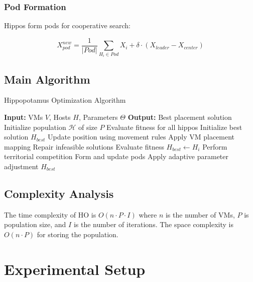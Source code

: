 \documentclass[10pt,conference]{IEEEtran}
\newcommand{\abbrev}{HO}
\begin{document}
\subsubsection{Pod Formation}

Hippos form pods for cooperative search:

\begin{equation}
X_{pod}^{new} = \frac{1}{|Pod|} \sum_{H_i \in Pod} X_i + \delta \cdot (X_{leader} - X_{center})
\end{equation}

\subsection{Main Algorithm}

\begin{algorithm}
\caption{Hippopotamus Optimization Algorithm}
\begin{algorithmic}[1]
\STATE \textbf{Input:} VMs $V$, Hosts $H$, Parameters $\Theta$
\STATE \textbf{Output:} Best placement solution
\STATE Initialize population $\mathcal{H}$ of size $P$
\STATE Evaluate fitness for all hippos
\STATE Initialize best solution $H_{best}$
        \STATE Update position using movement rules
        \STATE Apply VM placement mapping
        \STATE Repair infeasible solutions
        \STATE Evaluate fitness
            \STATE $H_{best} \leftarrow H_i$
        \ENDIF
    \ENDFOR
    \STATE Perform territorial competition
    \STATE Form and update pods
    \STATE Apply adaptive parameter adjustment
\ENDWHILE
\RETURN $H_{best}$
\end{algorithmic}
\end{algorithm}

\subsection{Complexity Analysis}

The time complexity of \abbrev{} is $O(n \cdot P \cdot I)$ where $n$ is the number of VMs, $P$ is population size, and $I$ is the number of iterations. The space complexity is $O(n \cdot P)$ for storing the population.

\section{Experimental Setup}
\label{sec:experimental_setup}
\end{document}
